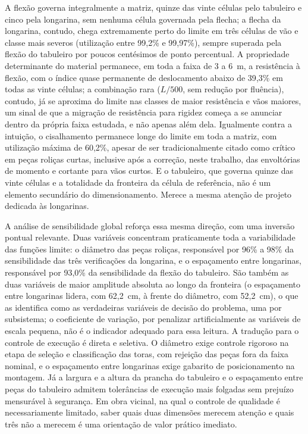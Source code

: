 A flexão governa integralmente a matriz, quinze das vinte células pelo tabuleiro e cinco pela longarina, sem nenhuma célula governada pela flecha; a flecha da longarina, contudo, chega extremamente perto do limite em três células de vão e classe mais severos (utilização entre 99{,}2\% e 99{,}97\%), sempre superada pela flexão do tabuleiro por poucos centésimos de ponto percentual.
A propriedade determinante do material permanece, em toda a faixa de 3 a 6~m, a resistência à flexão, com o índice quase permanente de deslocamento abaixo de 39{,}3\% em todas as vinte células; a combinação rara ($L/500$, sem redução por fluência), contudo, já se aproxima do limite nas classes de maior resistência e vãos maiores, um sinal de que a migração de resistência para rigidez começa a se anunciar dentro da própria faixa estudada, e não apenas além dela.
Igualmente contra a intuição, o cisalhamento permanece longe do limite em toda a matriz, com utilização máxima de 60{,}2\%, apesar de ser tradicionalmente citado como crítico em peças roliças curtas, inclusive após a correção, neste trabalho, das envoltórias de momento e cortante para vãos curtos.
E o tabuleiro, que governa quinze das vinte células e a totalidade da fronteira da célula de referência, não é um elemento secundário do dimensionamento. Merece a mesma atenção de projeto dedicada às longarinas.

A análise de sensibilidade global reforça essa mesma direção, com uma inversão pontual relevante.
Duas variáveis concentram praticamente toda a variabilidade das funções limite: o diâmetro das peças roliças, responsável por 96\% a 98\% da sensibilidade das três verificações da longarina, e o espaçamento entre longarinas, responsável por 93{,}0\% da sensibilidade da flexão do tabuleiro.
São também as duas variáveis de maior amplitude absoluta ao longo da fronteira (o espaçamento entre longarinas lidera, com 62{,}2~cm, à frente do diâmetro, com 52{,}2~cm), o que as identifica como as verdadeiras variáveis de decisão do problema, uma por subsistema; o coeficiente de variação, por penalizar artificialmente as variáveis de escala pequena, não é o indicador adequado para essa leitura.
A tradução para o controle de execução é direta e seletiva.
O diâmetro exige controle rigoroso na etapa de seleção e classificação das toras, com rejeição das peças fora da faixa nominal, e o espaçamento entre longarinas exige gabarito de posicionamento na montagem.
Já a largura e a altura da prancha do tabuleiro e o espaçamento entre peças do tabuleiro admitem tolerâncias de execução mais folgadas sem prejuízo mensurável à segurança.
Em obra vicinal, na qual o controle de qualidade é necessariamente limitado, saber quais duas dimensões merecem atenção e quais três não a merecem é uma orientação de valor prático imediato.

